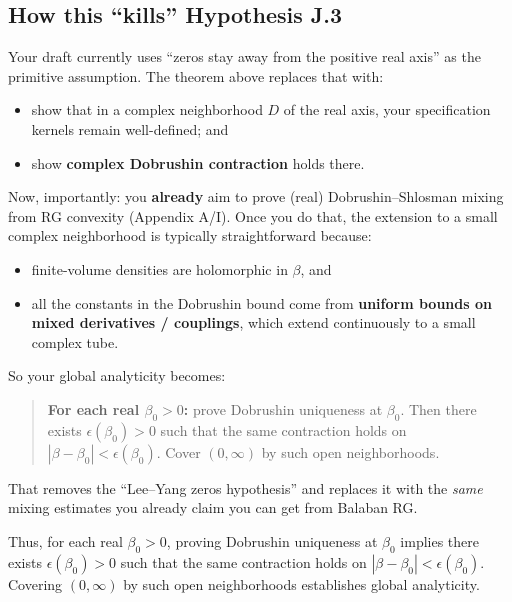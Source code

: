 \subsection{How this ``kills'' Hypothesis J.3}

Your draft currently uses ``zeros stay away from the positive real axis'' as the primitive assumption. The theorem above replaces that with:

\begin{itemize}
\item show that in a complex neighborhood $D$ of the real axis, your specification kernels remain well-defined; and
\item show \textbf{complex Dobrushin contraction} holds there.
\end{itemize}

Now, importantly: you \textbf{already} aim to prove (real) Dobrushin--Shlosman mixing from RG convexity (Appendix A/I). Once you do that, the extension to a small complex neighborhood is typically straightforward because:

\begin{itemize}
\item finite-volume densities are holomorphic in $\beta$, and
\item all the constants in the Dobrushin bound come from \textbf{uniform bounds on mixed derivatives / couplings}, which extend continuously to a small complex tube.
\end{itemize}

So your global analyticity becomes:

\begin{quote}
\textbf{For each real $\beta_0>0$:} prove Dobrushin uniqueness at $\beta_0$.
Then there exists $\epsilon(\beta_0)>0$ such that the same contraction holds on $|\beta-\beta_0|<\epsilon(\beta_0)$.
Cover $(0,\infty)$ by such open neighborhoods.
\end{quote}

That removes the ``Lee--Yang zeros hypothesis'' and replaces it with the \textit{same} mixing estimates you already claim you can get from Balaban RG.

Thus, for each real $\beta_0 > 0$, proving Dobrushin uniqueness at $\beta_0$ implies there exists $\epsilon(\beta_0) > 0$ such that the same contraction holds on $|\beta - \beta_0| < \epsilon(\beta_0)$. Covering $(0, \infty)$ by such open neighborhoods establishes global analyticity.


